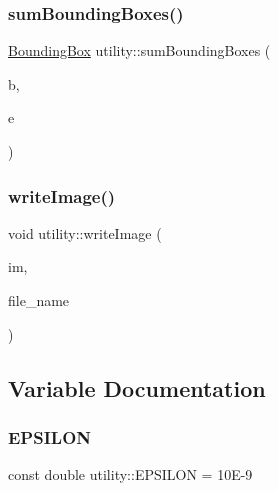 \mbox{\label{namespaceutility_a97d2cabbc342d0ed91c63fedd698a1af}} 
\subsubsection{\texorpdfstring{sumBoundingBoxes()}{sumBoundingBoxes()}\hspace{0.1cm}{\footnotesize\ttfamily [2/2]}}
{\footnotesize\ttfamily \mbox{\hyperlink{classBoundingBox}{Bounding\+Box}} utility\+::sum\+Bounding\+Boxes (\begin{DoxyParamCaption}\item[{std\+::vector$<$ \mbox{\hyperlink{classBoundedVolume}{Bounded\+Volume}} $\ast$ $>$\+::const\+\_\+iterator}]{b,  }\item[{std\+::vector$<$ \mbox{\hyperlink{classBoundedVolume}{Bounded\+Volume}} $\ast$ $>$\+::const\+\_\+iterator}]{e }\end{DoxyParamCaption})}

\mbox{\label{namespaceutility_a34be8140338c47d4f6547c1093a0d772}} 
\subsubsection{\texorpdfstring{writeImage()}{writeImage()}}
{\footnotesize\ttfamily void utility\+::write\+Image (\begin{DoxyParamCaption}\item[{std\+::vector$<$ std\+::vector$<$ \mbox{\hyperlink{classVector3D}{Vector3D}} $>$$>$ \&}]{im,  }\item[{std\+::string}]{file\+\_\+name }\end{DoxyParamCaption})}



\subsection{Variable Documentation}
\mbox{\label{namespaceutility_a5726adf0a326e6887e05b0f485e14fde}} 
\subsubsection{\texorpdfstring{EPSILON}{EPSILON}}
{\footnotesize\ttfamily const double utility\+::\+E\+P\+S\+I\+L\+ON = 10\+E-\/9}

